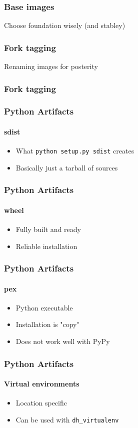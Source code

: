 \documentclass{beamer}
\begin{document}
\begin{frame}
\frametitle{Base images}
Choose foundation wisely (and stabley)
\end{frame}

\begin{frame}
\frametitle{Fork tagging}
Renaming images for posterity
\end{frame}

\begin{frame}[fragile]
\frametitle{Fork tagging}

\end{frame}

\begin{frame}[fragile]
\frametitle{Python Artifacts}
\framesubtitle{sdist}
\begin{itemize}
\item What \verb|python setup.py sdist| creates
\item Basically just a tarball of sources
\end{itemize}
\end{frame}

\begin{frame}[fragile]
\frametitle{Python Artifacts}
\framesubtitle{wheel}
\begin{itemize}
\item Fully built and ready
\item Reliable installation
\end{itemize}
\end{frame}

\begin{frame}[fragile]
\frametitle{Python Artifacts}
\framesubtitle{pex}
\begin{itemize}
\item Python executable
\item Installation is "copy"
\item Does not work well with PyPy
\end{itemize}
\end{frame}

\begin{frame}[fragile]
\frametitle{Python Artifacts}
\framesubtitle{Virtual environments}
\begin{itemize}
\item Location specific
\item Can be used with \verb|dh_virtualenv|
\end{itemize}
\end{frame}
\end{document}
